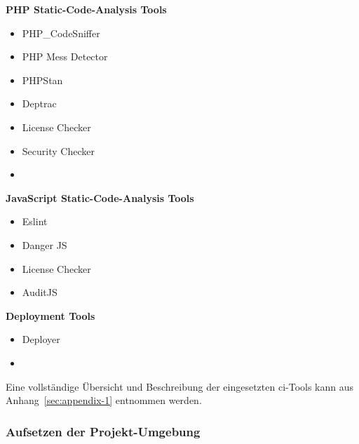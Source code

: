\hspace{0.025\textwidth}%
\begin{minipage}{0.5\textwidth}
    \textbf{PHP Static-Code-Analysis Tools}
    \vspace{-2mm}
    \begin{itemize}
        \setlength\itemsep{0.05em}
        \item PHP\_CodeSniffer
        \item PHP Mess Detector
        \item PHPStan
        \item Deptrac
        \item License Checker
        \item Security Checker
        \item[]
    \end{itemize}
\end{minipage}
\begin{minipage}{0.475\textwidth}
    \textbf{JavaScript Static-Code-Analysis Tools}
    \vspace{-2mm}
    \begin{itemize}
        \setlength\itemsep{-0.05em}
        \item Eslint
        \item Danger JS
        \item License Checker
        \item AuditJS
    \end{itemize}
    \textbf{Deployment Tools}
    \vspace{-2mm}
    \begin{itemize}
        \item Deployer
        \item[]
    \end{itemize}
    \vspace{-4.5mm}
\end{minipage}

Eine vollständige Übersicht und Beschreibung der eingesetzten \acrshort{ci}-Tools kann aus Anhang\ \ref{sec:appendix-1}
entnommen werden.

\subsubsection{Aufsetzen der Projekt-Umgebung}

